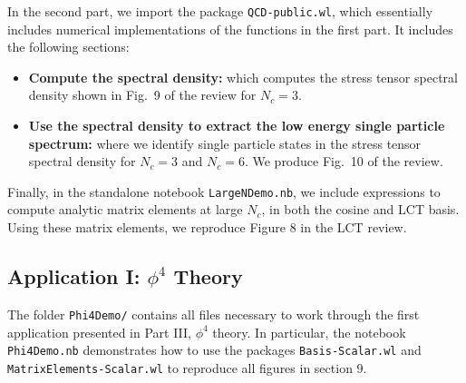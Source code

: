 \documentclass[12pt]{article}
\begin{document}
In the second part, we import the package {\tt QCD-public.wl}, which essentially includes numerical implementations of the functions in the first part. It includes the following sections:
\begin{itemize}
  \item \textbf{Compute the spectral density:} which computes the stress tensor spectral density shown in Fig.~9 of the review for $N_c = 3$.
  \item \textbf{Use the spectral density to extract the low energy single particle spectrum:} where we identify single particle states in the stress tensor spectral density for $N_c=3$ and $N_c = 6$. We produce Fig.~10 of the review.
\end{itemize}

Finally, in the standalone notebook {\tt LargeNDemo.nb}, we include expressions to compute analytic matrix elements at large $N_c$, in both the cosine and LCT basis. Using these matrix elements, we reproduce Figure 8 in the LCT review.

\subsection{Application I: $\phi^4$ Theory}

The folder {\tt Phi4Demo/} contains all files necessary to work through the first application presented in Part III, $\phi^4$ theory. In particular, the notebook {\tt Phi4Demo.nb} demonstrates how to use the packages {\tt Basis-Scalar.wl} and {\tt MatrixElements-Scalar.wl} to reproduce all figures in section 9.
\end{document}
